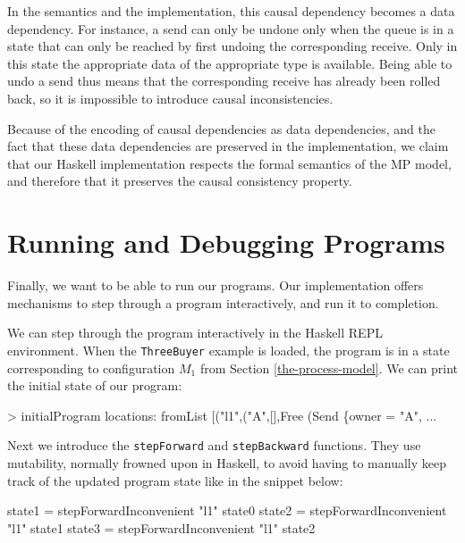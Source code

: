 \documentclass[runningheads,plain]{llncs}
\newenvironment{Shaded}{}{}
\newcommand{\DataTypeTok}[1]{\textcolor[rgb]{0.56,0.13,0.00}{#1}}
\newcommand{\StringTok}[1]{\textcolor[rgb]{0.25,0.44,0.63}{#1}}
\newcommand{\FunctionTok}[1]{\textcolor[rgb]{0.02,0.16,0.49}{#1}}
\newcommand{\NormalTok}[1]{#1}
\begin{document}
In the semantics and the implementation, this causal dependency becomes a data dependency. 
For instance, a send can only be undone only when the queue is in a state that can only be reached by first undoing the corresponding receive.
Only in this state the appropriate data  of the appropriate type is available.
Being able to undo a send thus means that the corresponding receive has already been rolled back, so it is impossible to introduce causal inconsistencies. 

Because of the encoding of causal dependencies as data dependencies, and the fact that these data dependencies are preserved in the implementation,  
we claim that our Haskell implementation respects the formal semantics of the MP model, and therefore that it preserves the causal consistency property.


\section{Running and Debugging Programs}\label{running-debugging}

Finally, we want to be able to run our programs. Our implementation
offers mechanisms to step through a program interactively, and run it to
completion.

We can step through the program interactively in the Haskell REPL
environment. 
When the \texttt{ThreeBuyer} example is loaded, the program is in a state corresponding to configuration $M_1$ from Section \ref{the-process-model}.
We can print the initial state of our program:

\begin{Shaded}
\begin{Highlighting}[]
\FunctionTok{>}\NormalTok{ initialProgram}
\NormalTok{locations}\FunctionTok{:}\NormalTok{ fromList [(}\StringTok{"l1"}\NormalTok{,(}\StringTok{"A"}\NormalTok{,[],}\DataTypeTok{Free}\NormalTok{ (}\DataTypeTok{Send}\NormalTok{ \{owner }\FunctionTok{=} \StringTok{"A"}\NormalTok{, }\FunctionTok{...} 
\end{Highlighting}
\end{Shaded}

Next we introduce the \texttt{stepForward} and \texttt{stepBackward}
functions. They use mutability, normally frowned upon in Haskell, to
avoid having to manually keep track of the updated program state like in
the snippet below:

\begin{Shaded}
\begin{Highlighting}[]
\NormalTok{state1 }\FunctionTok{=}\NormalTok{ stepForwardInconvenient }\StringTok{"l1"}\NormalTok{ state0}
\NormalTok{state2 }\FunctionTok{=}\NormalTok{ stepForwardInconvenient }\StringTok{"l1"}\NormalTok{ state1}
\NormalTok{state3 }\FunctionTok{=}\NormalTok{ stepForwardInconvenient }\StringTok{"l1"}\NormalTok{ state2}
\end{Highlighting}
\end{Shaded}
\end{document}
